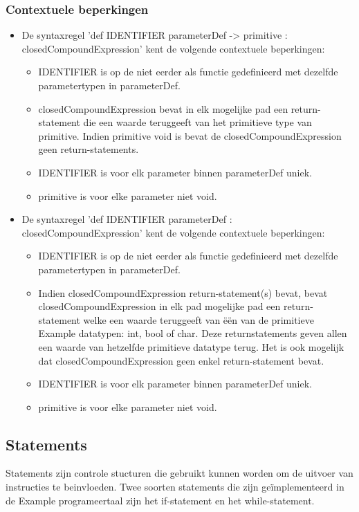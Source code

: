     \subsubsection{Contextuele beperkingen}
        \begin{itemize}
        \item De syntaxregel 'def IDENTIFIER parameterDef -> primitive $\colon$ closedCompoundExpression' kent de volgende contextuele beperkingen:
            \begin{itemize}
                \item IDENTIFIER is op de niet eerder als functie gedefinieerd met dezelfde parametertypen in parameterDef.
                \item closedCompoundExpression bevat in elk mogelijke pad een return-statement die een waarde teruggeeft van het primitieve type van primitive. Indien primitive void is bevat de closedCompoundExpression geen return-statements.
                \item IDENTIFIER is voor elk parameter binnen parameterDef uniek.
                \item primitive is voor elke parameter niet void.
            \end{itemize}
        \item De syntaxregel 'def IDENTIFIER parameterDef $\colon$ closedCompoundExpression' kent de volgende contextuele beperkingen:
            \begin{itemize}
                \item IDENTIFIER is op de niet eerder als functie gedefinieerd met dezelfde parametertypen in parameterDef.
                \item Indien closedCompoundExpression return-statement(s) bevat, bevat closedCompoundExpression in elk pad mogelijke pad een return-statement welke een waarde teruggeeft van \"{e}\"{e}n van de primitieve Example datatypen: int, bool of char. Deze returnstatements geven allen een waarde van hetzelfde primitieve datatype terug. Het is ook mogelijk dat closedCompoundExpression geen enkel return-statement bevat.
                \item IDENTIFIER is voor elk parameter binnen parameterDef uniek.
                \item primitive is voor elke parameter niet void.
            \end{itemize}
        \end{itemize}

\subsection{Statements}
Statements zijn controle stucturen die gebruikt kunnen worden om de uitvoer van instructies te beinvloeden. Twee soorten statements die zijn ge\"{i}mplementeerd in de Example programeertaal zijn het if-statement en het while-statement.
